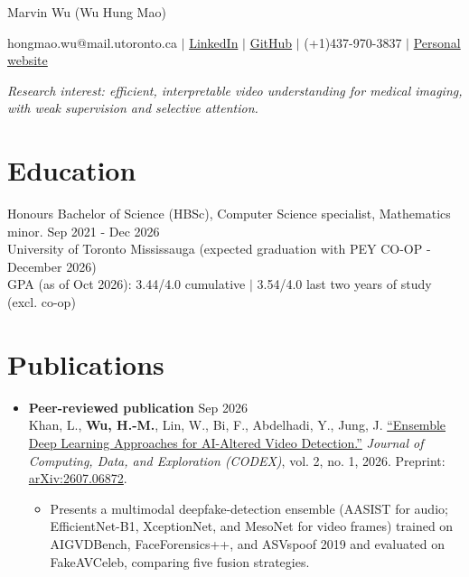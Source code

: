 \documentclass{article}
\begin{document}
\begin{center}
    Marvin Wu (Wu Hung Mao)

hongmao.wu@mail.utoronto.ca $\mid$
\href{https://www.linkedin.com/in/hungmao-wu/}{LinkedIn} $\mid$
\href{https://github.com/wuhungmao}{GitHub} $\mid$
(+1)437-970-3837 $\mid$
\href{https://wuhungmao.github.io/academic-work/}{Personal website}

\textit{Research interest: efficient, interpretable video understanding for medical imaging, with weak supervision and selective attention.}
\end{center}
\vspace{-4px}

\section*{Education}
\vspace{-8px}
Honours Bachelor of Science (HBSc), Computer Science specialist, Mathematics minor. \hfill Sep 2021 - Dec 2026\\
University of Toronto Mississauga (expected graduation with PEY CO-OP - December 2026)\\
GPA (as of Oct 2026): 3.44/4.0 cumulative $\mid$ 3.54/4.0 last two years of study (excl. co-op)
\vspace{-12px}

\section*{Publications}
\begin{itemize}
  \item[] \textbf{Peer-reviewed publication} \hfill Sep 2026 \\
  Khan, L., \textbf{Wu, H.-M.}, Lin, W., Bi, F., Abdelhadi, Y., Jung, J. \href{https://doi.org/10.33137/codex.v2i1.47792}{``Ensemble Deep Learning Approaches for AI-Altered Video Detection.''} \textit{Journal of Computing, Data, and Exploration (CODEX)}, vol. 2, no. 1, 2026. Preprint: \href{https://arxiv.org/abs/2607.06872}{arXiv:2607.06872}.
  \begin{itemize}
    \item Presents a multimodal deepfake-detection ensemble (AASIST for audio; EfficientNet-B1, XceptionNet, and MesoNet for video frames) trained on AIGVDBench, FaceForensics++, and ASVspoof 2019 and evaluated on FakeAVCeleb, comparing five fusion strategies.
  \end{itemize}
\end{itemize}
\end{document}
